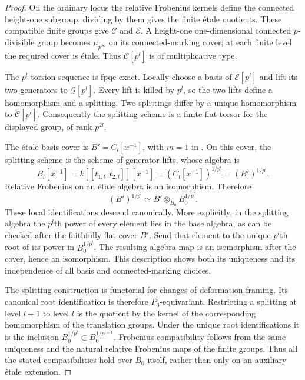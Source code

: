 \begin{proof}
On the ordinary locus the relative Frobenius kernels define
the connected height-one subgroup; dividing by them gives
the finite \'etale quotients.  These compatible finite
groups give $\mathcal C$ and $\mathcal E$.  A height-one
one-dimensional connected $p$-divisible group becomes
$\mu_{p^\infty}$ on its connected-marking cover; at each
finite level the required cover is \'etale.  Thus
$\mathcal C[p^l]$ is of multiplicative type.

The $p^l$-torsion sequence is fpqc exact.  Locally choose
a basis of $\mathcal E[p^l]$ and lift its two generators
to $\mathcal G[p^l]$.  Every lift is killed by $p^l$, so
the two lifts define a homomorphism and a splitting.
Two splittings differ by a unique homomorphism to
$\mathcal C[p^l]$.  Consequently the splitting scheme
is a finite flat torsor for the displayed group, of rank
$p^{2l}$.

The \'etale basis cover is
$B'=C_l[x^{-1}]$, with $m=1$ in
.  On this cover, the splitting
scheme is the scheme of generator lifts, whose algebra is
\[
 B_l[x^{-1}]
 =k[[t_{1,l},t_{2,l}]][x^{-1}]
 =(C_l[x^{-1}])^{1/p^l}=(B')^{1/p^l}.
\]
Relative Frobenius on an \'etale algebra is an isomorphism.
Therefore
\[
 (B')^{1/p^l}\simeq
 B'\otimes_{B_0}B_0^{1/p^l}.
\]
These local identifications descend canonically.  More
explicitly, in the splitting algebra the $p^l$th power
of every element lies in the base algebra, as can be
checked after the faithfully flat cover $B'$.  Send
that element to the unique $p^l$th root of its power in
$B_0^{1/p^l}$.  The resulting algebra map is an
isomorphism after the cover, hence an isomorphism.
This description shows both its uniqueness and its
independence of all basis and connected-marking choices.

The splitting construction is functorial for changes of
deformation framing.  Its canonical root identification
is therefore $P_3$-equivariant.  Restricting a splitting
at level $l+1$ to level $l$ is the quotient by the kernel
of the corresponding homomorphism of the translation
groups.  Under the unique root identifications it is
the inclusion $B_0^{1/p^l}\subset B_0^{1/p^{l+1}}$.
Frobenius compatibility follows from the same uniqueness
and the natural relative Frobenius maps of the finite
groups.  Thus all the stated compatibilities hold over
$B_0$ itself, rather than only on an auxiliary \'etale
extension.
\end{proof}
